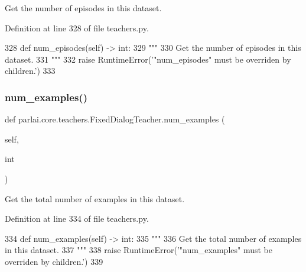 \begin{DoxyVerb}Get the number of episodes in this dataset.
\end{DoxyVerb}
 

Definition at line 328 of file teachers.\+py.


\begin{DoxyCode}
328     \textcolor{keyword}{def }num\_episodes(self) -> int:
329         \textcolor{stringliteral}{"""}
330 \textcolor{stringliteral}{        Get the number of episodes in this dataset.}
331 \textcolor{stringliteral}{        """}
332         \textcolor{keywordflow}{raise} RuntimeError(\textcolor{stringliteral}{'"num\_episodes" must be overriden by children.'})
333 
\end{DoxyCode}
\mbox{\label{classparlai_1_1core_1_1teachers_1_1FixedDialogTeacher_a38bd0d5c98506c45eb87d6db32d1c0bf}} 
\subsubsection{\texorpdfstring{num\+\_\+examples()}{num\_examples()}}
{\footnotesize\ttfamily def parlai.\+core.\+teachers.\+Fixed\+Dialog\+Teacher.\+num\+\_\+examples (\begin{DoxyParamCaption}\item[{}]{self,  }\item[{}]{int }\end{DoxyParamCaption})}

\begin{DoxyVerb}Get the total number of examples in this dataset.
\end{DoxyVerb}
 

Definition at line 334 of file teachers.\+py.


\begin{DoxyCode}
334     \textcolor{keyword}{def }num\_examples(self) -> int:
335         \textcolor{stringliteral}{"""}
336 \textcolor{stringliteral}{        Get the total number of examples in this dataset.}
337 \textcolor{stringliteral}{        """}
338         \textcolor{keywordflow}{raise} RuntimeError(\textcolor{stringliteral}{'"num\_examples" must be overriden by children.'})
339 
\end{DoxyCode}
\mbox{\label{classparlai_1_1core_1_1teachers_1_1FixedDialogTeacher_a32febe29909f7523b0d7b5ee7335fd05}} 
